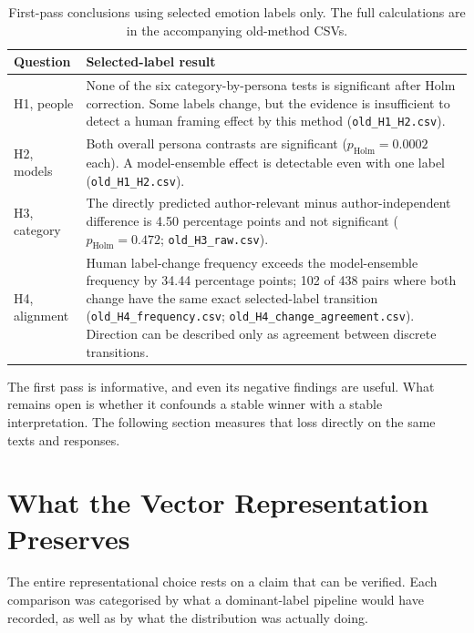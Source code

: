 \begin{table}[h]
\centering
\footnotesize
\caption{First-pass conclusions using selected emotion labels only. The full calculations are in the accompanying old-method CSVs.}
\label{tab:oldfirst}
\begin{tabular}{p{1.2cm}p{9.8cm}}
\hline
\textbf{Question} & \textbf{Selected-label result} \\
\hline
H1, people & None of the six category-by-persona tests is significant after Holm correction. Some labels change, but the evidence is insufficient to detect a human framing effect by this method (\texttt{old\_H1\_H2.csv}). \\
H2, models & Both overall persona contrasts are significant ($p_{\mathrm{Holm}}=0.0002$ each). A model-ensemble effect is detectable even with one label (\texttt{old\_H1\_H2.csv}). \\
H3, category & The directly predicted author-relevant minus author-independent difference is 4.50 percentage points and not significant ($p_{\mathrm{Holm}}=0.472$; \texttt{old\_H3\_raw.csv}). \\
H4, alignment & Human label-change frequency exceeds the model-ensemble frequency by 34.44 percentage points; 102 of 438 pairs where both change have the same exact selected-label transition (\texttt{old\_H4\_frequency.csv}; \texttt{old\_H4\_change\_agreement.csv}). Direction can be described only as agreement between discrete transitions. \\
\hline
\end{tabular}
\end{table}

\noindent
The first pass is informative, and even its negative findings are useful. What remains open is whether it
confounds a stable winner with a stable interpretation. The following section measures that loss
directly on the same texts and responses.

\section{What the Vector Representation Preserves}
\label{res:vectorization}

\noindent
The entire representational choice rests on a claim that can be verified. Each comparison was
categorised by what a dominant-label pipeline would have recorded, as well as by what the
distribution was actually doing.

